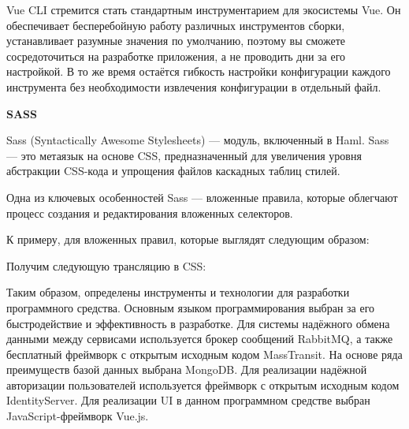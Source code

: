 Vue CLI стремится стать стандартным инструментарием для экосистемы Vue. Он обеспечивает бесперебойную работу различных инструментов сборки, устанавливает разумные значения по умолчанию, поэтому вы сможете сосредоточиться на разработке приложения, а не проводить дни за его настройкой. В то же время остаётся гибкость настройки конфигурации каждого инструмента без необходимости извлечения конфигурации в отдельный файл.

\bigskip
\textbf{SASS}

Sass (Syntactically Awesome Stylesheets) — модуль, включенный в Haml. Sass — это метаязык на основе CSS, предназначенный для увеличения уровня абстракции CSS-кода и упрощения файлов каскадных таблиц стилей.

Одна из ключевых особенностей Sass — вложенные правила, которые облегчают процесс создания и редактирования вложенных селекторов.

К примеру, для вложенных правил, которые выглядят следующим образом:



Получим следующую трансляцию в CSS:



Таким образом, определены инструменты и технологии для разработки программного средства. Основным языком программирования выбран \csharp за его быстродействие и эффективность в разработке. Для системы надёжного обмена данными между сервисами используется брокер сообщений RabbitMQ, а также бесплатный фреймворк с открытым исходным кодом MassTransit. На основе ряда преимуществ базой данных выбрана MongoDB. Для реализации надёжной авторизации пользователей используется фреймворк с открытым исходным кодом IdentityServer. Для реализации UI в данном программном средстве выбран JavaScript-фреймворк Vue.js.
